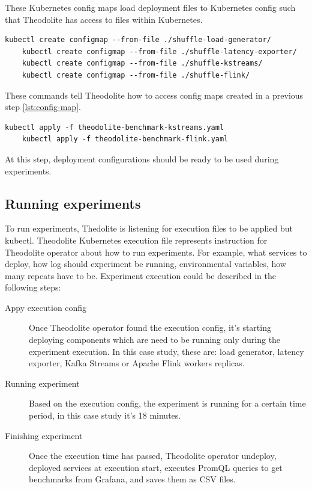 These Kubernetes config maps load deployment files to Kubernetes config such that Theodolite
has access to files within Kubernetes.
\begin{lstlisting}[label={lst:config-map}]
    kubectl create configmap --from-file ./shuffle-load-generator/
    kubectl create configmap --from-file ./shuffle-latency-exporter/
    kubectl create configmap --from-file ./shuffle-kstreams/
    kubectl create configmap --from-file ./shuffle-flink/
\end{lstlisting}


These commands tell Theodolite how to access config maps created in a previous step \ref{lst:config-map}.
\begin{lstlisting}[label={lst:config-map-theodo}]
    kubectl apply -f theodolite-benchmark-kstreams.yaml
    kubectl apply -f theodolite-benchmark-flink.yaml
\end{lstlisting}

At this step, deployment configurations should be ready to be used during experiments.


\subsection{Running experiments}\label{subsec:running-experiments}
To run experiments, Thedolite is listening for execution files to be applied but
kubectl.
Theodolite Kubernetes execution file represents instruction for Theodolite operator
about how to run experiments.
For example, what services to deploy, how log should experiment be running, environmental
variables, how many repeats have to be.
Experiment execution could be described in the following steps:

\begin{description}
    \item[Appy execution config] Once Theodolite operator found the execution config, it's
    starting deploying components which are need to be running only during the experiment execution.
    In this case study, these are: load generator, latency exporter, Kafka Streams or Apache Flink
    workers replicas.
    \item[Running experiment] Based on the execution config, the experiment is running for a certain
    time period, in this case study it's 18 minutes.
    \item[Finishing experiment] Once the execution time has passed, Theodolite operator undeploy,
    deployed services at execution start, executes PromQL queries to get benchmarks from Grafana,
    and saves them as CSV files.
\end{description}

